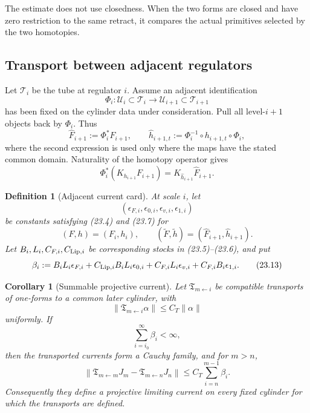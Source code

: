 \documentclass[11pt]{article}
\newtheorem{corollary}[theorem]{Corollary}
\newtheorem{definition}[theorem]{Definition}
\begin{document}
The estimate does not use closedness.  When the two forms are closed and
have zero restriction to the same retract, it compares the actual
primitives selected by the two homotopies.

\subsection{Transport between adjacent regulators}

Let \(\mathcal T_i\) be the tube at regulator \(i\).  Assume an adjacent
identification
\[
 \Phi_i:\mathcal U_i\subset\mathcal T_i
       \longrightarrow\mathcal U_{i+1}\subset\mathcal T_{i+1}
 \tag{23.9}
\]
has been fixed on the cylinder data under consideration.  Pull all
level-\(i+1\) objects back by \(\Phi_i\).  Thus
\[
 \widehat F_{i+1}:=\Phi_i^*F_{i+1},\qquad
 \widehat h_{i+1,t}:=\Phi_i^{-1}\circ h_{i+1,t}\circ\Phi_i,
 \tag{23.10}
\]
where the second expression is used only where the maps have the stated
common domain.  Naturality of the homotopy operator gives
\[
 \Phi_i^*(K_{h_{i+1}}F_{i+1})
 =K_{\widehat h_{i+1}}\widehat F_{i+1}.
 \tag{23.11}
\]

\begin{definition}[Adjacent current card]
\label{def:v11v23-card}
At scale \(i\), let
\[
 (\epsilon_{F,i},\epsilon_{0,i},\epsilon_{v,i},\epsilon_{1,i})
 \tag{23.12}
\]
be constants satisfying (23.4) and (23.7) for
\[
 (F,h)=(F_i,h_i),\qquad
 (\widetilde F,\widetilde h)
   =(\widehat F_{i+1},\widehat h_{i+1}).
\]
Let \(B_i,L_i,C_{F,i},C_{{\rm Lip},i}\) be corresponding stocks in
(23.5)--(23.6), and put
\[
 \beta_i:=
 B_iL_i\epsilon_{F,i}
 +C_{{\rm Lip},i}B_iL_i\epsilon_{0,i}
 +C_{F,i}L_i\epsilon_{v,i}
 +C_{F,i}B_i\epsilon_{1,i}.
 \tag{23.13}
\]
\end{definition}

\begin{corollary}[Summable projective current]
\label{cor:v11v23-projective-current}
Let \(\mathfrak T_{m\leftarrow i}\) be compatible transports of one-forms
to a common later cylinder, with
\[
 \|\mathfrak T_{m\leftarrow i}\alpha\|
 \leq C_T\|\alpha\|
 \tag{23.14}
\]
uniformly.  If
\[
 \sum_{i=i_0}^{\infty}\beta_i<\infty,
 \tag{23.15}
\]
then the transported currents form a Cauchy family, and for \(m>n\),
\[
 \left\|
 \mathfrak T_{m\leftarrow m}J_m
 -\mathfrak T_{m\leftarrow n}J_n
 \right\|
 \leq
 C_T\sum_{i=n}^{m-1}\beta_i.
 \tag{23.16}
\]
Consequently they define a projective limiting current on every fixed
cylinder for which the transports are defined.
\end{corollary}
\end{document}
